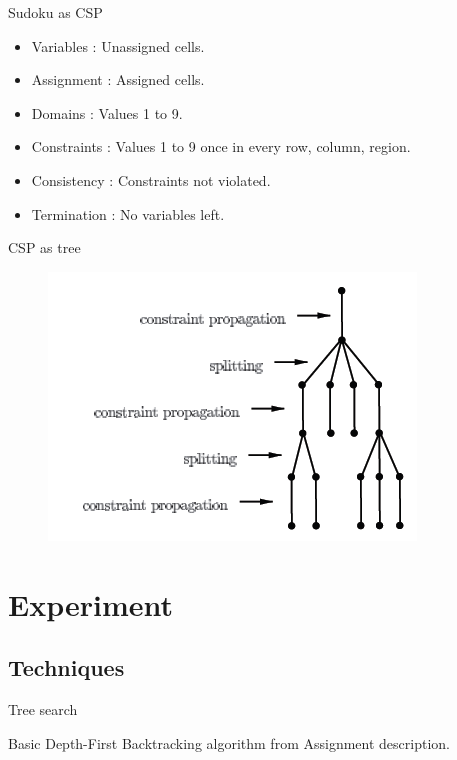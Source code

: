 \documentclass{beamer}
\begin{document}
\begin{frame}{Sudoku as CSP}

  \begin{itemize}
  \item
    Variables   : Unassigned cells.
  \item
    Assignment  : Assigned cells.
  \item
    Domains     : Values 1 to 9.
  \item
    Constraints : Values 1 to 9 once in every row, column, region.
  \item
    Consistency : Constraints not violated.
  \item
    Termination : No variables left.
  \end{itemize}
\end{frame}

\begin{frame}{CSP as tree}

\begin{figure}[htbp]

\begin{center}
\includegraphics{tree.png}
\end{center}

\end{figure}

\end{frame}

\section{Experiment}
\subsection[Techniques]{Techniques}

\begin{frame}{Tree search}

Basic Depth-First Backtracking algorithm from Assignment description.

\end{frame}
\end{document}
